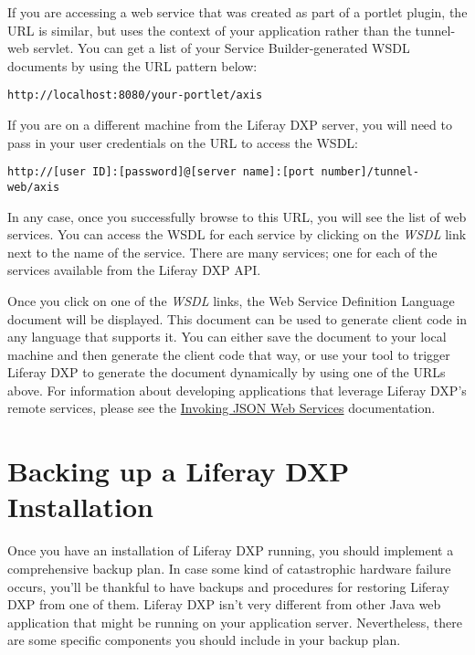 If you are accessing a web service that was created as part of a portlet
plugin, the URL is similar, but uses the context of your application
rather than the tunnel-web servlet. You can get a list of your Service
Builder-generated WSDL documents by using the URL pattern below:

\begin{verbatim}
http://localhost:8080/your-portlet/axis
\end{verbatim}

If you are on a different machine from the Liferay DXP server, you will
need to pass in your user credentials on the URL to access the WSDL:

\begin{verbatim}
http://[user ID]:[password]@[server name]:[port number]/tunnel-web/axis
\end{verbatim}

In any case, once you successfully browse to this URL, you will see the
list of web services. You can access the WSDL for each service by
clicking on the \emph{WSDL} link next to the name of the service. There
are many services; one for each of the services available from the
Liferay DXP API.

Once you click on one of the \emph{WSDL} links, the Web Service
Definition Language document will be displayed. This document can be
used to generate client code in any language that supports it. You can
either save the document to your local machine and then generate the
client code that way, or use your tool to trigger Liferay DXP to
generate the document dynamically by using one of the URLs above. For
information about developing applications that leverage Liferay DXP's
remote services, please see the
\href{/docs/7-0/tutorials/-/knowledge_base/t/invoking-json-web-services}{Invoking
JSON Web Services} documentation.

\chapter{Backing up a Liferay DXP
Installation}\label{backing-up-a-liferay-dxp-installation}

Once you have an installation of Liferay DXP running, you should
implement a comprehensive backup plan. In case some kind of catastrophic
hardware failure occurs, you'll be thankful to have backups and
procedures for restoring Liferay DXP from one of them. Liferay DXP isn't
very different from other Java web application that might be running on
your application server. Nevertheless, there are some specific
components you should include in your backup plan.

